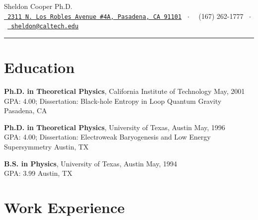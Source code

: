 \documentclass[letterpaper]{article}
\def\name{Sheldon Cooper Ph.D.}
\renewenvironment{itemize}{
  \begin{list}{}{
    \setlength{\leftmargin}{1.5em}
  }
}{
  \end{list}
}
\begin{document}
\begin{center}
{\huge \name} \\

\vspace{0.25in}
\vspace{0.0in}
\href{https://www.google.com/search?q=google+map+Pasadena+CA}{\tt \faMapMarker \ 2311 N. Los Robles Avenue \#4A, Pasadena, CA 91101} \
$\cdot$ \ \faPhone \ (167) 262-1777 \
$\cdot$ \ \href{mailto:sheldon@caltech.edu}{\tt \faEnvelope \ sheldon@caltech.edu}
\rule{0.9\paperwidth}{0.4pt}
\end{center}

\section*{Education}

\begin{itemize}

  \item[$\bullet$] \textbf{Ph.D. in Theoretical Physics}, California Institute of Technology \hfill May, 2001 \\
  GPA: 4.00; Dissertation: Black-hole Entropy in Loop Quantum Gravity \hfill Pasadena, CA

  \item[$\bullet$] \textbf{Ph.D. in Theoretical Physics}, University of Texas, Austin \hfill May, 1996 \\
  GPA: 4.00; Dissertation: Electroweak Baryogenesis and Low Energy Supersymmetry \hfill Austin, TX

  \item[$\bullet$] \textbf{B.S. in Physics}, University of Texas, Austin \hfill May, 1994 \\
  GPA: 3.99 \hfill Austin, TX

\end{itemize}

\section*{Work Experience}
\end{document}
